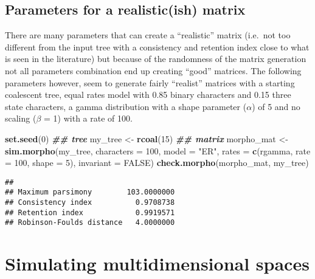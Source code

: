 \documentclass[
]{book}
\newenvironment{Shaded}{\begin{snugshade}}{\end{snugshade}}
\newcommand{\AttributeTok}[1]{\textcolor[rgb]{0.13,0.29,0.53}{#1}}
\newcommand{\ConstantTok}[1]{\textcolor[rgb]{0.56,0.35,0.01}{#1}}
\newcommand{\DecValTok}[1]{\textcolor[rgb]{0.00,0.00,0.81}{#1}}
\newcommand{\DocumentationTok}[1]{\textcolor[rgb]{0.56,0.35,0.01}{\textbf{\textit{#1}}}}
\newcommand{\FunctionTok}[1]{\textcolor[rgb]{0.13,0.29,0.53}{\textbf{#1}}}
\newcommand{\NormalTok}[1]{#1}
\newcommand{\OtherTok}[1]{\textcolor[rgb]{0.56,0.35,0.01}{#1}}
\newcommand{\StringTok}[1]{\textcolor[rgb]{0.31,0.60,0.02}{#1}}
\begin{document}
\hypertarget{parameters-for-a-realisticish-matrix}{%
\subsection{Parameters for a realistic(ish) matrix}\label{parameters-for-a-realisticish-matrix}}

There are many parameters that can create a ``realistic'' matrix (i.e.~not too different from the input tree with a consistency and retention index close to what is seen in the literature) but because of the randomness of the matrix generation not all parameters combination end up creating ``good'' matrices.
The following parameters however, seem to generate fairly ``realist'' matrices with a starting coalescent tree, equal rates model with 0.85 binary characters and 0.15 three state characters, a gamma distribution with a shape parameter (\(\alpha\)) of 5 and no scaling (\(\beta\) = 1) with a rate of 100.

\begin{Shaded}
\begin{Highlighting}[]
\FunctionTok{set.seed}\NormalTok{(}\DecValTok{0}\NormalTok{)}
\DocumentationTok{\#\# tree}
\NormalTok{my\_tree }\OtherTok{\textless{}{-}} \FunctionTok{rcoal}\NormalTok{(}\DecValTok{15}\NormalTok{)}
\DocumentationTok{\#\# matrix}
\NormalTok{morpho\_mat }\OtherTok{\textless{}{-}} \FunctionTok{sim.morpho}\NormalTok{(my\_tree,}
                         \AttributeTok{characters =} \DecValTok{100}\NormalTok{,}
                         \AttributeTok{model =} \StringTok{"ER"}\NormalTok{,}
                         \AttributeTok{rates =} \FunctionTok{c}\NormalTok{(rgamma, }\AttributeTok{rate =} \DecValTok{100}\NormalTok{, }\AttributeTok{shape =} \DecValTok{5}\NormalTok{),}
                         \AttributeTok{invariant =} \ConstantTok{FALSE}\NormalTok{)}
\FunctionTok{check.morpho}\NormalTok{(morpho\_mat, my\_tree)}
\end{Highlighting}
\end{Shaded}

\begin{verbatim}
##                                     
## Maximum parsimony        103.0000000
## Consistency index          0.9708738
## Retention index            0.9919571
## Robinson-Foulds distance   4.0000000
\end{verbatim}

\hypertarget{simulating-multidimensional-spaces}{%
\section{Simulating multidimensional spaces}\label{simulating-multidimensional-spaces}}
\end{document}
